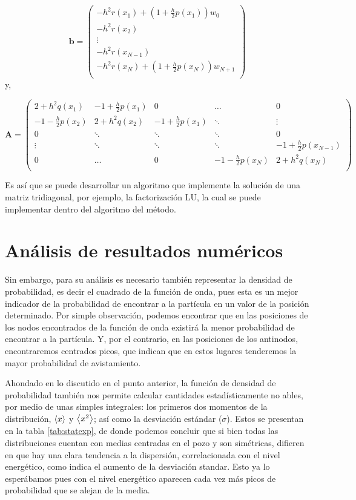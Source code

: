 \documentclass[12pt,twoside]{extarticle}
\begin{document}
\begin{equation*}
\textbf{b}=
\begin{pmatrix}
    -h^2r(x_1)+\left(1+\frac{h}{2}p(x_1)\right)w_0 \\
    -h^2r(x_2) \\
    \vdots \\
    -h^2r(x_{N-1}) \\
    -h^2r(x_N)+\left(1+\frac{h}{2}p(x_N)\right)w_{N+1} \\
\end{pmatrix}
\end{equation*}
y,

\begin{equation*}
\textbf{A}=
\begin{pmatrix}
    2+h^2q(x_1) & -1+\frac{h}{2}p(x_1) & 0 & \hdots & 0\\
    -1-\frac{h}{2}p(x_2) & 2+h^2q(x_2) & -1+\frac{h}{2}p(x_1) & \ddots & \vdots  \\
    0 & \ddots & \ddots & \ddots & 0 \\
    \vdots & \ddots & \ddots & \ddots & -1+\frac{h}{2}p(x_{N-1}) \\
    0 & \hdots & 0 & -1-\frac{h}{2}p(x_N) & 2+h^2q(x_N) \\
\end{pmatrix}
\end{equation*}


Es así que se puede desarrollar un algoritmo que implemente la solución de una matriz tridiagonal, por ejemplo, la factorización LU, la cual se puede implementar dentro del algoritmo del método. 
\section{Análisis de resultados numéricos}
Sin embargo, para su análisis es necesario también representar la densidad de probabilidad, es decir el cuadrado de la función de onda, pues esta es un mejor indicador de la probabilidad de encontrar a la partícula en un valor de la posición determinado. Por simple observación, podemos encontrar que en las posiciones de los nodos encontrados de la función de onda existirá la menor probabilidad de encontrar a la partícula. Y, por el contrario, en las posiciones de los antinodos, encontraremos centrados picos, que indican que en estos lugares tenderemos la mayor probabilidad de avistamiento.

Ahondado en lo discutido en el punto anterior, la función de densidad de probabilidad también nos permite calcular cantidades estadísticamente no ables, por medio de unas simples integrales: los primeros dos momentos de la distribución, $\expval{x}$ y $\expval{x^2}$; así como la desviación estándar ($\sigma$). Estos se presentan en la tabla \ref{tab:statexp}, de donde podemos concluir que si bien todas las distribuciones cuentan con medias centradas en el pozo y son simétricas, difieren en que hay una clara tendencia a la dispersión, correlacionada con el nivel energético, como indica el aumento de la desviación standar. Esto ya lo esperábamos pues con el nivel energético aparecen cada vez más picos de probabilidad que se alejan de la media.
\end{document}
